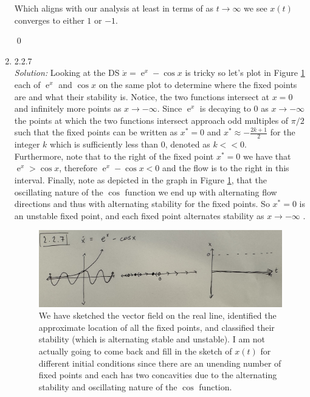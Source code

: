 \documentclass[10pt]{amsart}
\DeclareMathOperator{\E}{e}
\theoremstyle{nonumberplain}
\begin{document}
\begin{enumerate}[label={\bf {\arabic*}:}]
\noindent
Which aligns with our analysis at least in terms of as $t \rightarrow \infty$ we see $x(t)$ converges to either $1$ or $-1$.

\qed \\

\newpage

\item 2.2.7 \\
\textit{Solution:} Looking at the DS $\dot x = \E^x - \cos x$ is tricky so let's plot in Figure \ref{fig:f2} each of $\E^x$ and $\cos x$ on the same plot to determine where the fixed points are and what their stability is.
Notice, the two functions intersect at $x = 0$ and infinitely more points as $x \rightarrow - \infty$.
Since $\E^x$ is decaying to 0 as $x \rightarrow - \infty$ the points at which the two functions intersect approach odd multiples of $\pi/2$ such that the fixed points can be written as $x^* = 0$ and $x^* \approx - \frac {2k + 1}{2}$ for the integer $k$ which is sufficiently less than 0, denoted as $k << 0$. \\

\noindent
Furthermore, note that to the right of the fixed point $x^* = 0$ we have that $\E^x > \cos x$, therefore $\E^x - \cos x < 0$ and the flow is to the right in this interval. 
Finally, note as depicted in the graph in Figure \ref{fig:f2}, that the oscillating nature of the $\cos$ function we end up with alternating flow directions and thus with alternating stability for the fixed points.
So $x^* = 0$ is an unstable fixed point, and each fixed point alternates stability as $x \rightarrow - \infty$ .
\begin{figure}[h]
	\centering
	\includegraphics[width=1\textwidth]{2_2_7.png}
 	\caption{We have sketched the vector field on the real line, identified the approximate location of all the fixed points, and classified their stability (which is alternating stable and unstable). I am not actually going to come back and fill in the sketch of $x(t)$ for different initial conditions since there are an unending number of fixed points and each has two concavities due to the alternating stability and oscillating nature of the $\cos$ function.}\label{fig:f2}
\end{figure}


\end{enumerate}
\end{document}
